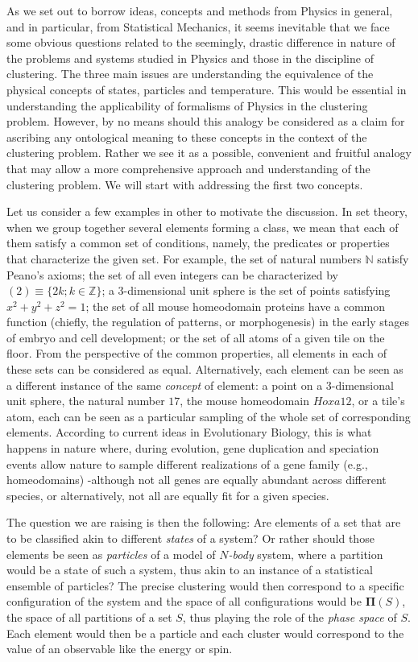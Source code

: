 \documentclass[twocolumn,aps,sort,nofootinbib]{revtex4}
\begin{document}
As we set out to borrow ideas, concepts and methods from Physics in general, 
and in particular, from Statistical Mechanics, it seems inevitable that
we face some obvious questions related to the seemingly, drastic difference in nature of
the problems and systems studied in Physics and those in the discipline
of clustering. The three main issues are understanding the equivalence
of the physical concepts of states, particles and temperature. This
would be essential in understanding the applicability of formalisms
of Physics in the clustering problem. However, by no means should this
analogy be considered as a claim for ascribing any ontological meaning
to these concepts in the context of the clustering problem. 
Rather we see it as a possible, convenient and fruitful analogy
that may allow a more comprehensive approach and understanding
of the clustering problem.
We will start with addressing the first two concepts.

Let us consider a few examples in other to motivate the discussion.
In set theory, when we group together several elements forming a class, we
mean that each of them satisfy a common set of conditions, namely, the
predicates or properties that characterize the given set. For example, the set
of natural numbers $\mathbb{N}$ satisfy Peano's axioms; the set of all 
even integers can be characterized by $(2)\equiv \{2k; k\in \mathbb{Z}\}$;
a $3$-dimensional unit sphere is the set of points satisfying 
$x^2+y^2+z^2=1$; the set of all mouse homeodomain proteins have a common
function (chiefly, the regulation of patterns, or morphogenesis) 
in the early stages of embryo and cell development; 
or the set of all atoms of a given tile on the floor. 
From the perspective of the
common properties, all elements in each of these sets can be considered as equal. Alternatively,
each element can be seen as a different instance of the same {\sl concept}
of element: a point on a $3$-dimensional unit sphere, the natural number
$17$, the mouse homeodomain $Hoxa12$, or a tile's atom, each can be seen 
as a particular sampling of
the whole set of corresponding elements. According to current ideas in
Evolutionary Biology, this is what happens
in nature where, during evolution, gene duplication
and speciation events allow nature to sample different 
realizations of a gene family (e.g., homeodomains) -although not all genes are equally 
abundant across different species, or alternatively, not all are equally fit 
for a given species. 

The question we are raising is then the following:
Are elements of a set that are to be classified akin to different {\sl states} 
of a system? 
Or rather should those elements be seen as {\sl particles} of 
a model of {\sl $N$-body} system, where 
a partition would be a state of such a system,
thus akin to an instance of a statistical ensemble of particles? The precise
clustering would then correspond to a specific configuration of the
system and the space of all configurations would be $\boldsymbol{\Pi}(S)$,
the space of all partitions of a set $S$, thus playing the role of the
{\sl phase space} of $S$. Each element would then be a 
particle and each cluster would correspond to the value of an observable like the energy or 
spin.
\end{document}
